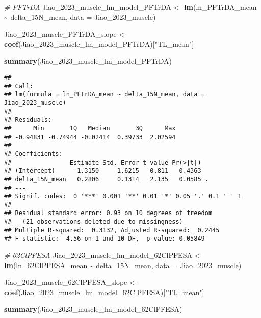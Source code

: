 \documentclass[
]{article}
\newenvironment{Shaded}{\begin{snugshade}}{\end{snugshade}}
\newcommand{\AttributeTok}[1]{\textcolor[rgb]{0.13,0.29,0.53}{#1}}
\newcommand{\CommentTok}[1]{\textcolor[rgb]{0.56,0.35,0.01}{\textit{#1}}}
\newcommand{\FunctionTok}[1]{\textcolor[rgb]{0.13,0.29,0.53}{\textbf{#1}}}
\newcommand{\NormalTok}[1]{#1}
\newcommand{\OtherTok}[1]{\textcolor[rgb]{0.56,0.35,0.01}{#1}}
\newcommand{\SpecialCharTok}[1]{\textcolor[rgb]{0.81,0.36,0.00}{\textbf{#1}}}
\newcommand{\StringTok}[1]{\textcolor[rgb]{0.31,0.60,0.02}{#1}}
\begin{document}
\begin{Shaded}
\begin{Highlighting}[]
\CommentTok{\# PFTrDA}
\NormalTok{Jiao\_2023\_muscle\_lm\_model\_PFTrDA }\OtherTok{\textless{}{-}} \FunctionTok{lm}\NormalTok{(ln\_PFTrDA\_mean }\SpecialCharTok{\textasciitilde{}}\NormalTok{ delta\_15N\_mean,}
                                    \AttributeTok{data =}\NormalTok{ Jiao\_2023\_muscle)}

\NormalTok{Jiao\_2023\_muscle\_PFTrDA\_slope }\OtherTok{\textless{}{-}} \FunctionTok{coef}\NormalTok{(Jiao\_2023\_muscle\_lm\_model\_PFTrDA)[}\StringTok{"TL\_mean"}\NormalTok{]}

\FunctionTok{summary}\NormalTok{(Jiao\_2023\_muscle\_lm\_model\_PFTrDA)}
\end{Highlighting}
\end{Shaded}

\begin{verbatim}
## 
## Call:
## lm(formula = ln_PFTrDA_mean ~ delta_15N_mean, data = Jiao_2023_muscle)
## 
## Residuals:
##      Min       1Q   Median       3Q      Max 
## -0.94831 -0.74944 -0.02414  0.39733  2.02594 
## 
## Coefficients:
##                Estimate Std. Error t value Pr(>|t|)  
## (Intercept)     -1.3150     1.6215  -0.811   0.4363  
## delta_15N_mean   0.2806     0.1314   2.135   0.0585 .
## ---
## Signif. codes:  0 '***' 0.001 '**' 0.01 '*' 0.05 '.' 0.1 ' ' 1
## 
## Residual standard error: 0.93 on 10 degrees of freedom
##   (21 observations deleted due to missingness)
## Multiple R-squared:  0.3132, Adjusted R-squared:  0.2445 
## F-statistic:  4.56 on 1 and 10 DF,  p-value: 0.05849
\end{verbatim}

\begin{Shaded}
\begin{Highlighting}[]
\CommentTok{\# 62ClPFESA}
\NormalTok{Jiao\_2023\_muscle\_lm\_model\_62ClPFESA }\OtherTok{\textless{}{-}} \FunctionTok{lm}\NormalTok{(ln\_62ClPFESA\_mean }\SpecialCharTok{\textasciitilde{}}\NormalTok{ delta\_15N\_mean,}
                                    \AttributeTok{data =}\NormalTok{ Jiao\_2023\_muscle)}

\NormalTok{Jiao\_2023\_muscle\_62ClPFESA\_slope }\OtherTok{\textless{}{-}} \FunctionTok{coef}\NormalTok{(Jiao\_2023\_muscle\_lm\_model\_62ClPFESA)[}\StringTok{"TL\_mean"}\NormalTok{]}

\FunctionTok{summary}\NormalTok{(Jiao\_2023\_muscle\_lm\_model\_62ClPFESA)}
\end{Highlighting}
\end{Shaded}
\end{document}
